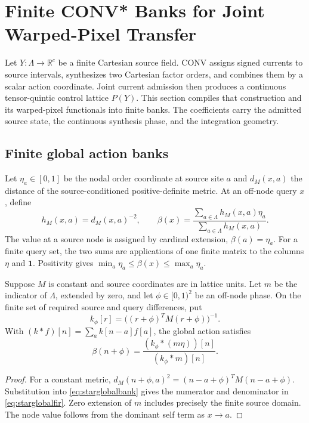 \section{Finite CONV* Banks for Joint Warped-Pixel Transfer}
\label{app:convstarwarp}

Let $Y:\Lambda\to\mathbb R^c$ be a finite Cartesian source field. CONV
assigns signed currents to source intervals, synthesizes two Cartesian factor
orders, and combines them by a scalar action coordinate. Joint current
admission then produces a continuous tensor-quintic control lattice $P(Y)$.
This section compiles that construction and its warped-pixel functionals into
finite banks. The coefficients carry the admitted source state, the
continuous synthesis phase, and the integration geometry.

\subsection{Finite global action banks}
Let $\eta_a\in[0,1]$ be the nodal order coordinate at source site $a$ and
$d_M(x,a)$ the distance of the source-conditioned positive-definite metric.
At an off-node query $x$, define
\begin{equation}
 h_M(x,a)=d_M(x,a)^{-2},\qquad
 \beta(x)=\frac{\sum_{a\in\Lambda}h_M(x,a)\eta_a}
 {\sum_{a\in\Lambda}h_M(x,a)}.
 \label{eq:starglobalbank}
\end{equation}
The value at a source node is assigned by cardinal extension,
$\beta(a)=\eta_a$. For a finite query set, the two sums are applications of
one finite matrix to the columns $\eta$ and $\mathbf1$. Positivity gives
$\min_a\eta_a\leq\beta(x)\leq\max_a\eta_a$.

\begin{proposition}
Suppose $M$ is constant and source coordinates are in lattice units. Let
$m$ be the indicator of $\Lambda$, extended by zero, and let
$\phi\in[0,1)^2$ be an off-node phase. On the finite set of required source
and query differences, put
\begin{equation}
 k_\phi[r]=\bigl((r+\phi)^TM(r+\phi)\bigr)^{-1}.
\end{equation}
With $(k*f)[n]=\sum_a k[n-a]f[a]$, the global action satisfies
\begin{equation}
 \beta(n+\phi)=\frac{(k_\phi*(m\eta))[n]}{(k_\phi*m)[n]}.
 \label{eq:starglobalfir}
\end{equation}
\end{proposition}
\begin{proof}
For a constant metric, $d_M(n+\phi,a)^2=(n-a+\phi)^TM(n-a+\phi)$.
Substitution into \eqref{eq:starglobalbank} gives the numerator and denominator
in \eqref{eq:starglobalfir}. Zero extension of $m$ includes precisely the
finite source domain. The node value follows from the dominant self term as
$x\to a$.
\end{proof}

